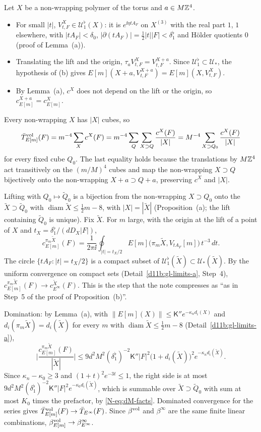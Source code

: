 \begin{step}
Let $X$ be a non-wrapping polymer of the torus and $a\in M\mathbb Z^4$.
\begin{itemize}
\item For small $|t|$, $V^X_{t,F}\in\mathcal U^\flat_1(X)$: it is $e^{\ii\eta tA_F}$ on $X^{(3)}$ with the real part $1$, $1$ elsewhere, with $|tA_F|<\delta_0$, $|\partial(tA_F)|=\frac12|t||F|<\delta_1^\flat$ and Hölder quotients $0$ (proof of Lemma~(a)).
\item Translating the lift and the origin, $\tau_aV^X_{t,F}=V^{X+a}_{t,F}$. Since $\mathcal U^\flat_1\subset\mathcal U_*$, the hypothesis of (b) gives $E[m](X+a,V^{X+a}_{t,F})=E[m](X,V^X_{t,F})$.
\item By Lemma~(a), $c^X$ does not depend on the lift or the origin, so $c^{X+a}_{E[m]}=c^X_{E[m]}$.
\end{itemize}
Every non-wrapping $X$ has $|X|$ cubes, so
\[
\bar T^{\rm vol}_{E[m]}(F)=m^{-4}\sum_Xc^X(F)=m^{-4}\sum_Q\sum_{X\supset Q}\frac{c^X(F)}{|X|}=M^{-4}\sum_{X\supset Q_0}\frac{c^X(F)}{|X|}
\]
for every fixed cube $Q_0$. The last equality holds because the translations by $M\mathbb Z^4$ act transitively on the $(m/M)^4$ cubes and map the non-wrapping $X\supset Q$ bijectively onto the non-wrapping $X+a\supset Q+a$, preserving $c^X$ and $|X|$.

Lifting with $Q_0\mapsto\tilde Q_0$ is a bijection from the non-wrapping $X\supset Q_0$ onto the $\tilde X\supset\tilde Q_0$ with $\operatorname{diam}\tilde X\le\frac12m-8$, with $|X|=|\tilde X|$ (Proposition~(a); the lift containing $\tilde Q_0$ is unique). Fix $\tilde X$. For $m$ large, with the origin at the lift of a point of $X$ and $t_X=\delta_1^\flat/(dD_X|F|)$,
\[
c^{\pi_m\tilde X}_{E[m]}(F)=\frac1{2\pi\ii}\oint_{|t|=t_X/2}E[m]\big(\pi_m\tilde X,V_{tA_F}[m]\big)\,t^{-3}\,dt .
\]
The circle $\{tA_F:|t|=t_X/2\}$ is a compact subset of $\mathcal U^\flat_1(\tilde X)\subset\mathcal U_*(\tilde X)$. By the uniform convergence on compact sets (Detail~\ref{d11b:gl-limits-a}, Step~4), $c^{\pi_m\tilde X}_{E[m]}(F)\to c^{\tilde X}_{E^\infty}(F)$. This is the step that the note compresses as ``as in Step~5 of the proof of Proposition~(b)''.

Domination: by Lemma~(a), with $\|E[m](X)\|\le\mathsf K''e^{-\kappa_nd_i(X)}$ and $d_i(\pi_m\tilde X)=d_i(\tilde X)$ for every $m$ with $\operatorname{diam}\tilde X\le\frac12m-8$ (Detail~\ref{d11b:gl-limits-a}),
\[
\Big|\frac{c^{\pi_m\tilde X}_{E[m]}(F)}{|\tilde X|}\Big|\le9d^2M^2(\delta_1^\flat)^{-2}\mathsf K''|F|^2\big(1+d_i(\tilde X)\big)^2e^{-\kappa_nd_i(\tilde X)} .
\]
Since $\kappa_n-\kappa_0\ge3$ and $(1+t)^2e^{-3t}\le1$, the right side is at most $9d^2M^2(\delta_1^\flat)^{-2}\mathsf K''|F|^2e^{-\kappa_0d_i(\tilde X)}$, which is summable over $\tilde X\supset\tilde Q_0$ with sum at most $K_0$ times the prefactor, by \eqref{N-eq:dM-facts}. Dominated convergence for the series gives $\bar T^{\rm vol}_{E[m]}(F)\to\bar T_{E^\infty}(F)$. Since $\beta^{\rm vol}$ and $\beta^\infty$ are the same finite linear combinations, $\beta^{\rm vol}_{E[m]}\to\beta^\infty_{E^\infty}$.
\end{step}

